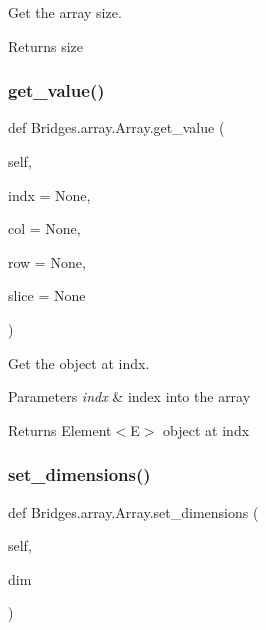 Get the array size. 

\begin{DoxyReturn}{Returns}
size 
\end{DoxyReturn}
\mbox{\label{class_bridges_1_1array_1_1_array_af736e28d3c0171b9ce7f730897e3d8c0}} 
\subsubsection{\texorpdfstring{get\+\_\+value()}{get\_value()}}
{\footnotesize\ttfamily def Bridges.\+array.\+Array.\+get\+\_\+value (\begin{DoxyParamCaption}\item[{}]{self,  }\item[{}]{indx = {\ttfamily None},  }\item[{}]{col = {\ttfamily None},  }\item[{}]{row = {\ttfamily None},  }\item[{}]{slice = {\ttfamily None} }\end{DoxyParamCaption})}



Get the object at \textquotesingle{}indx\textquotesingle{}. 


\begin{DoxyParams}{Parameters}
{\em indx} & index into the array \\
\hline
\end{DoxyParams}
\begin{DoxyReturn}{Returns}
Element$<$\+E$>$ object at \textquotesingle{}indx\textquotesingle{} 
\end{DoxyReturn}
\mbox{\label{class_bridges_1_1array_1_1_array_aeb34acd2d485e00a520b30def036c04a}} 
\subsubsection{\texorpdfstring{set\+\_\+dimensions()}{set\_dimensions()}}
{\footnotesize\ttfamily def Bridges.\+array.\+Array.\+set\+\_\+dimensions (\begin{DoxyParamCaption}\item[{}]{self,  }\item[{}]{dim }\end{DoxyParamCaption})}



